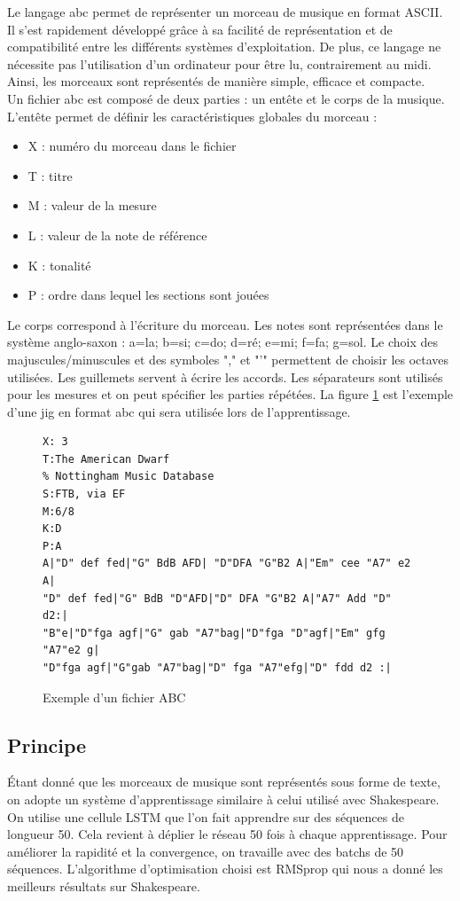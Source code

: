 Le langage abc permet de représenter un morceau de musique en format ASCII. Il s'est rapidement développé grâce à sa facilité de représentation et de compatibilité entre les différents systèmes d'exploitation. De plus, ce langage ne nécessite pas l'utilisation d'un ordinateur pour être lu, contrairement au midi. Ainsi, les morceaux sont représentés de manière simple, efficace et compacte. \\
Un fichier abc est composé de deux parties : un entête et le corps de la musique.
L'entête permet de définir les caractéristiques globales du morceau :
\begin{itemize}
\item X : numéro du morceau dans le fichier
\item T : titre
\item M : valeur de la mesure
\item L : valeur de la note de référence
\item K : tonalité
\item P : ordre dans lequel les sections sont jouées
\end{itemize}
Le corps correspond à l'écriture du morceau. Les notes sont représentées dans le système anglo-saxon : a=la; b=si; c=do; d=ré; e=mi; f=fa; g=sol. Le choix des majuscules/minuscules et des symboles "," et "'" permettent de choisir les octaves utilisées. Les guillemets servent à écrire les accords. Les séparateurs sont utilisés pour les mesures et on peut spécifier les parties répétées. La figure \ref{fichier_abc_jig_exemple} est l'exemple d'une jig en format abc qui sera utilisée lors de l'apprentissage. 

\begin{figure}[!h]
\begin{verbatim}
X: 3
T:The American Dwarf
% Nottingham Music Database
S:FTB, via EF
M:6/8
K:D
P:A
A|"D" def fed|"G" BdB AFD| "D"DFA "G"B2 A|"Em" cee "A7" e2 A|
"D" def fed|"G" BdB "D"AFD|"D" DFA "G"B2 A|"A7" Add "D" d2:|
"B"e|"D"fga agf|"G" gab "A7"bag|"D"fga "D"agf|"Em" gfg "A7"e2 g|
"D"fga agf|"G"gab "A7"bag|"D" fga "A7"efg|"D" fdd d2 :|
\end{verbatim}
\caption{Exemple d'un fichier ABC}
\label{fichier_abc_jig_exemple}
\end{figure}

\subsection{Principe}
Étant donné que les morceaux de musique sont représentés sous forme de texte, on adopte un système d'apprentissage similaire à celui utilisé avec Shakespeare. \\
On utilise une cellule LSTM que l'on fait apprendre sur des séquences de longueur 50. Cela revient à déplier le réseau 50 fois à chaque apprentissage. Pour améliorer la rapidité et la convergence, on travaille avec des batchs de 50 séquences. L'algorithme d'optimisation choisi est RMSprop qui nous a donné les meilleurs résultats sur Shakespeare.

